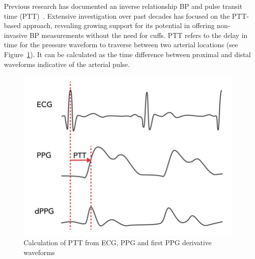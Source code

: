 Previous research has documented an inverse relationship BP and pulse transit time (PTT)~\cite{mukkamalaUbiquitousBloodPressure2015}.
Extensive investigation over past decades has focused on the PTT-based approach, revealing growing support for its potential in offering non-invasive BP measurements without the need for cuffs.
PTT refers to the delay in time for the pressure waveform to traverse between two arterial locations (see Figure~\ref{fig:ptt}).
It can be calculated as the time difference between proximal and distal waveforms indicative of the arterial pulse.
\begin{figure}[h]
    \centering
    \includegraphics[scale=0.4]{images/sp/ptt}
    \caption{Calculation of PTT from ECG, PPG and first PPG derivative waveforms~\cite{luiNovelCalibrationProcedure2018}}
    \label{fig:ptt}
\end{figure}

